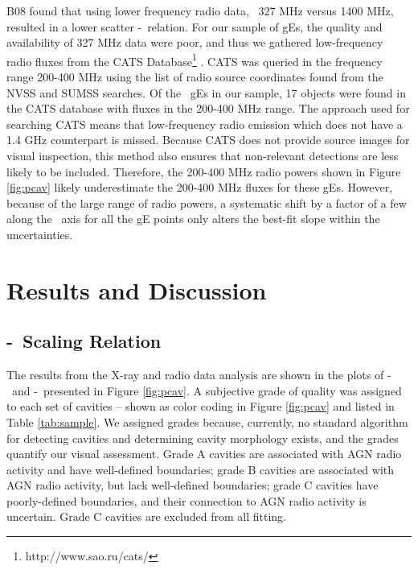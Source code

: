 \documentclass{emulateapj}
\begin{document}
B08 found that using lower frequency radio data, \ie\ 327 MHz versus
1400 MHz, resulted in a lower scatter \pcav-\prad\ relation. For our
sample of gEs, the quality and availability of 327 MHz data were poor,
and thus we gathered low-frequency radio fluxes from the CATS
Database\footnote{http://www.sao.ru/cats/} \citep{cats}. CATS was
queried in the frequency range 200-400 MHz using the list of radio
source coordinates found from the NVSS and SUMSS searches. Of the
\samp\ gEs in our sample, 17 objects were found in the CATS database
with fluxes in the 200-400 MHz range. The approach used for searching
CATS means that low-frequency radio emission which does not have a 1.4
GHz counterpart is missed. Because CATS does not provide source images
for visual inspection, this method also ensures that non-relevant
detections are less likely to be included. Therefore, the 200-400 MHz
radio powers shown in Figure \ref{fig:pcav} likely underestimate the
200-400 MHz fluxes for these gEs. However, because of the large range
of radio powers, a systematic shift by a factor of a few along the
\prad\ axis for all the gE points only alters the best-fit slope
within the uncertainties.

\section{Results and Discussion}
\label{sec:r&d}

\subsection{\pjet-\prad\ Scaling Relation}
\label{sec:relation}

The results from the X-ray and radio data analysis are shown in the
plots of \pcav-\phigh\ and \pcav-\plow\ presented in Figure
\ref{fig:pcav}. A subjective grade of quality was assigned to each set
of cavities -- shown as color coding in Figure \ref{fig:pcav} and
listed in Table \ref{tab:sample}. We assigned grades because,
currently, no standard algorithm for detecting cavities and
determining cavity morphology exists, and the grades quantify our
visual assessment. Grade A cavities are associated with AGN radio
activity and have well-defined boundaries; grade B cavities are
associated with AGN radio activity, but lack well-defined boundaries;
grade C cavities have poorly-defined boundaries, and their connection
to AGN radio activity is uncertain. Grade C cavities are excluded from
all fitting.
\end{document}
